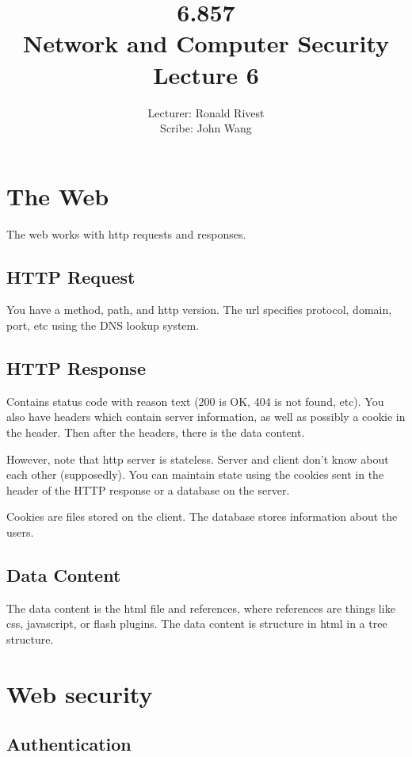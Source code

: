 \documentclass[psamsfonts]{amsart}
\title{6.857 \\
Network and Computer Security \\
Lecture 6}
\author{Lecturer: Ronald Rivest\\
Scribe: John Wang}
\begin{document}
\maketitle

\section{The Web}

The web works with http requests and responses.

\subsection{HTTP Request}

You have a method, path, and http version. The url specifies protocol, domain, port, etc using the DNS lookup system.

\subsection{HTTP Response}

Contains status code with reason text (200 is OK, 404 is not found, etc). You also have headers which contain server information, as well as possibly a cookie in the header. Then after the headers, there is the data content.

However, note that http server is stateless. Server and client don't know about each other (supposedly). You can maintain state using the cookies sent in the header of the HTTP response or a database on the server.

Cookies are files stored on the client. The database stores information about the users.

\subsection{Data Content}

The data content is the html file and references, where references are things like css, javascript, or flash plugins. The data content is structure in html in a tree structure. 

\section{Web security}

\subsection{Authentication}
\end{document}
